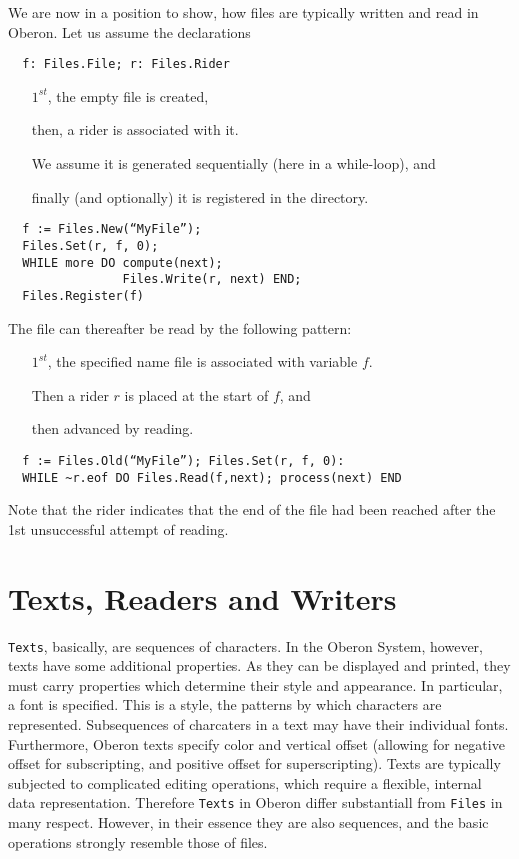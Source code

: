We are now in a position to show, how files are typically written and read in Oberon. Let
us assume the declarations
\begin{verbatim}
  f: Files.File; r: Files.Rider
\end{verbatim}
\begin{itemize}
  \item[$1^{st}$,] the empty file is created,
  \item[then,] a rider is associated with it.
  \item[We assume] it is generated sequentially (here in a while-loop), and
  \item[finally] (and optionally) it is registered in the directory.
\end{itemize}
\begin{verbatim}
  f := Files.New(“MyFile”);
  Files.Set(r, f, 0);
  WHILE more DO compute(next);
                Files.Write(r, next) END;
  Files.Register(f)
\end{verbatim}
The file can thereafter be read by the following pattern:
\begin{itemize}
  \item[$1^{st}$,] the specified name file is associated with variable $f$.
  \item[Then] a rider $r$ is placed at the start of $f$, and
  \item[then] advanced by reading.
\end{itemize}
\begin{verbatim}
  f := Files.Old(“MyFile”); Files.Set(r, f, 0):
  WHILE ~r.eof DO Files.Read(f,next); process(next) END
\end{verbatim}
Note that the rider indicates that the end of the file had been reached after the 1st
unsuccessful attempt of reading.

\section{Texts, Readers and Writers}
\label{sec:texts}
\verb|Texts|, basically, are sequences of characters. In the Oberon System, however, texts
have some additional properties. As they can be displayed and printed, they must carry
properties which determine their style and appearance. In particular, a font is specified.
This is a style, the patterns by which characters are represented. Subsequences of charcaters
in a text may have their individual fonts. Furthermore, Oberon texts specify color and
vertical offset (allowing for negative offset for subscripting, and positive offset for
superscripting). Texts are typically subjected to complicated editing operations, which
require a flexible, internal data representation. Therefore \verb|Texts| in Oberon differ
substantiall from \verb|Files| in many respect. However, in their essence they are also
sequences, and the basic operations strongly resemble those of files.


